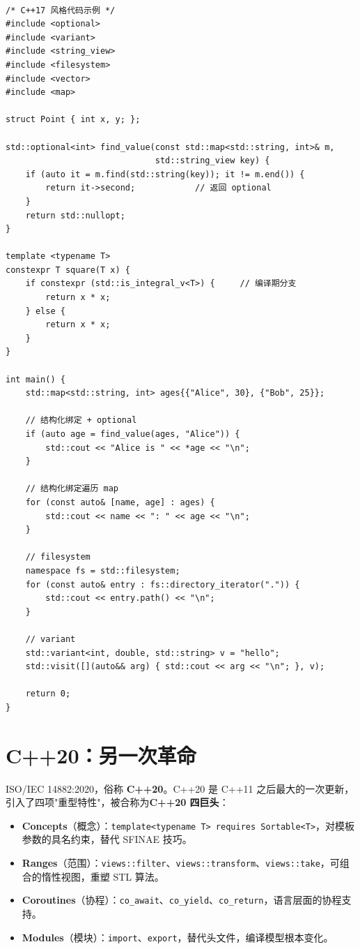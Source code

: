 \documentclass[12pt,a4paper,fontset=fandol]{ctexbook}
\newcommand{\cppxxlabel}[1]{%
  \tcbox[on line,colback=cppheadbg,colframe=cppheadbg,
    boxrule=0pt,arc=1pt,left=2pt,right=2pt,top=1pt,bottom=1pt,
    colupper=white,fontupper=\scriptsize\bfseries]{#1}}
\newcommand{\yearlabel}[1]{%
  \tcbox[on line,colback=yearheadbg,colframe=yearheadbg,
    boxrule=0pt,arc=1pt,left=3pt,right=3pt,top=1pt,bottom=1pt,
    colupper=white,fontupper=\scriptsize\bfseries]{#1}}
\newcommand{\kw}[1]{\texttt{#1}}
\newcommand{\yrlbl}[1]{\yearlabel{#1}}
\begin{document}
\cppxxlabel{C++17}\ \begin{lstlisting}
/* C++17 风格代码示例 */
#include <optional>
#include <variant>
#include <string_view>
#include <filesystem>
#include <vector>
#include <map>

struct Point { int x, y; };

std::optional<int> find_value(const std::map<std::string, int>& m,
                              std::string_view key) {
    if (auto it = m.find(std::string(key)); it != m.end()) {
        return it->second;            // 返回 optional
    }
    return std::nullopt;
}

template <typename T>
constexpr T square(T x) {
    if constexpr (std::is_integral_v<T>) {     // 编译期分支
        return x * x;
    } else {
        return x * x;
    }
}

int main() {
    std::map<std::string, int> ages{{"Alice", 30}, {"Bob", 25}};

    // 结构化绑定 + optional
    if (auto age = find_value(ages, "Alice")) {
        std::cout << "Alice is " << *age << "\n";
    }

    // 结构化绑定遍历 map
    for (const auto& [name, age] : ages) {
        std::cout << name << ": " << age << "\n";
    }

    // filesystem
    namespace fs = std::filesystem;
    for (const auto& entry : fs::directory_iterator(".")) {
        std::cout << entry.path() << "\n";
    }

    // variant
    std::variant<int, double, std::string> v = "hello";
    std::visit([](auto&& arg) { std::cout << arg << "\n"; }, v);

    return 0;
}
\end{lstlisting}

\section{C++20：另一次革命}

\yrlbl{2020} ISO/IEC 14882:2020，俗称 \textbf{C++20}。C++20 是 C++11 之后最大的一次更新，引入了四项"重型特性"，被合称为\textbf{C++20 四巨头}：

\begin{itemize}
  \item \textbf{Concepts}（概念）：\kw{template<typename T> requires Sortable<T>}，对模板参数的具名约束，替代 SFINAE 技巧。
  \item \textbf{Ranges}（范围）：\kw{views::filter}、\kw{views::transform}、\kw{views::take}，可组合的惰性视图，重塑 STL 算法。
  \item \textbf{Coroutines}（协程）：\kw{co\_await}、\kw{co\_yield}、\kw{co\_return}，语言层面的协程支持。
  \item \textbf{Modules}（模块）：\kw{import}、\kw{export}，替代头文件，编译模型根本变化。
\end{itemize}
\end{document}
